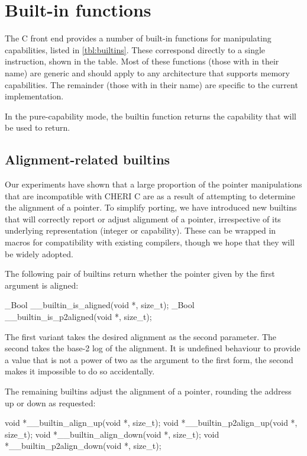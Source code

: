 \section{Built-in functions}

The C front end provides a number of built-in functions for manipulating capabilities, listed in \autoref{tbl:builtins}.
These correspond directly to a single instruction, shown in the table.
Most of these functions (those with  in their name) are generic and should apply to any architecture that supports memory capabilities.
The remainder (those with  in their name) are specific to the current implementation.

In the pure-capability mode, the  builtin function returns the capability that will be used to return.

\subsection{Alignment-related builtins}

Our experiments have shown that a large proportion of the pointer manipulations that are incompatible with CHERI C are as a result of attempting to determine the alignment of a pointer.
To simplify porting, we have introduced new builtins that will correctly report or adjust alignment of a pointer, irrespective of its underlying representation (integer or capability).
These can be wrapped in macros for compatibility with existing compilers, though we hope that they will be widely adopted.

The following pair of builtins return whether the pointer given by the first argument is aligned:

\begin{csnippet}
_Bool __builtin_is_aligned(void *, size_t);
_Bool __builtin_is_p2aligned(void *, size_t);
\end{csnippet}

The first variant takes the desired alignment as the second parameter.
The second takes the base-2 log of the alignment.
It is undefined behaviour to provide a value that is not a power of two as the argument to the first form, the second makes it impossible to do so accidentally.

The remaining builtins adjust the alignment of a pointer, rounding the address up or down as requested:

\begin{csnippet}
void *__builtin_align_up(void *, size_t);
void *__builtin_p2align_up(void *, size_t);
void *__builtin_align_down(void *, size_t);
void *__builtin_p2align_down(void *, size_t);
\end{csnippet}

